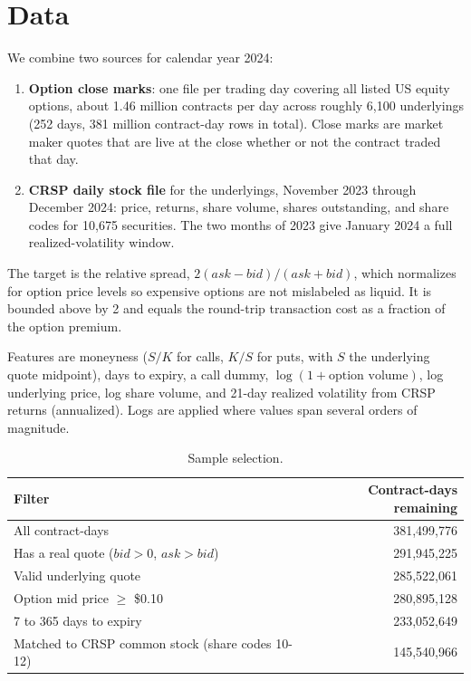 \documentclass[11pt]{article}
\begin{document}
\section{Data}

We combine two sources for calendar year 2024:

\begin{enumerate}
  \item \textbf{Option close marks}: one file per trading day covering all
  listed US equity options, about 1.46 million contracts per day across
  roughly 6,100 underlyings (252 days, 381 million contract-day rows in
  total). Close marks are market maker quotes that are live at the close
  whether or not the contract traded that day.
  \item \textbf{CRSP daily stock file} for the underlyings, November 2023
  through December 2024: price, returns, share volume, shares outstanding, and
  share codes for 10,675 securities. The two months of 2023 give January 2024
  a full realized-volatility window.
\end{enumerate}

The target is the relative spread, $2(ask - bid)/(ask + bid)$, which
normalizes for option price levels so expensive options are not mislabeled as
liquid. It is bounded above by 2 and equals the round-trip transaction cost as
a fraction of the option premium.

Features are moneyness ($S/K$ for calls, $K/S$ for puts, with $S$ the
underlying quote midpoint), days to expiry, a call dummy, $\log(1 +
\text{option volume})$, log underlying price, log share volume, and 21-day
realized volatility from CRSP returns (annualized). Logs are applied where
values span several orders of magnitude.

\begin{table}[H]
\centering
\caption{Sample selection.}
\begin{tabular}{lr}
\toprule
Filter & Contract-days remaining \\
\midrule
All contract-days & 381,499,776 \\
Has a real quote ($bid > 0$, $ask > bid$) & 291,945,225 \\
Valid underlying quote & 285,522,061 \\
Option mid price $\geq$ \$0.10 & 280,895,128 \\
7 to 365 days to expiry & 233,052,649 \\
Matched to CRSP common stock (share codes 10-12) & 145,540,966 \\
\bottomrule
\end{tabular}
\end{table}
\end{document}
